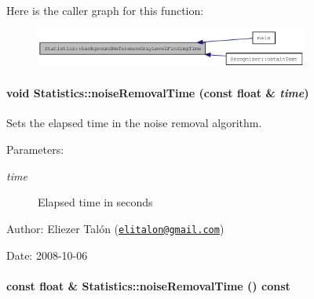 Here is the caller graph for this function:\nopagebreak
\begin{figure}[H]
\begin{center}
\leavevmode
\includegraphics[width=255pt]{class_statistics_d65adc1b3bd1d560408c5f9e06fde3d4_icgraph}
\end{center}
\end{figure}
\hypertarget{class_statistics_dc21ff96ff4ddda9384eb03ac6de20de}{
\paragraph[{noiseRemovalTime}]{\setlength{\rightskip}{0pt plus 5cm}void Statistics::noiseRemovalTime (const float \& {\em time})}\hfill}
\label{class_statistics_dc21ff96ff4ddda9384eb03ac6de20de}


Sets the elapsed time in the noise removal algorithm. 

\begin{Desc}
\item[Parameters:]
\begin{description}
\item[{\em time}]Elapsed time in seconds\end{description}
\end{Desc}
\begin{Desc}
\item[Author:]Eliezer Talón (\href{mailto:elitalon@gmail.com}{\tt elitalon@gmail.com}) \end{Desc}
\begin{Desc}
\item[Date:]2008-10-06 \end{Desc}
\hypertarget{class_statistics_2851ad08e1bd9604fe76c78cccc50e84}{
\paragraph[{noiseRemovalTime}]{\setlength{\rightskip}{0pt plus 5cm}const float \& Statistics::noiseRemovalTime () const}\hfill}
\label{class_statistics_2851ad08e1bd9604fe76c78cccc50e84}


